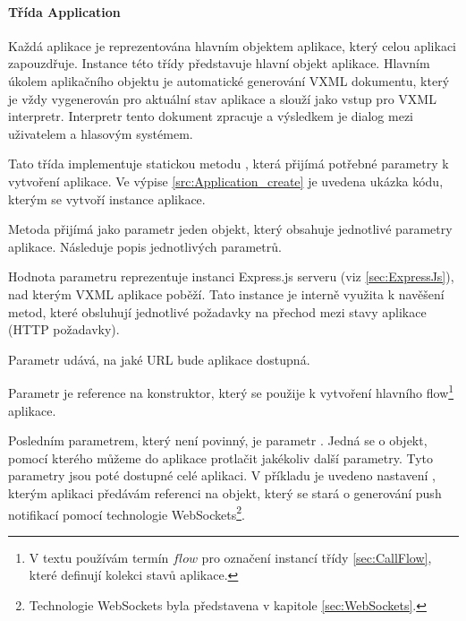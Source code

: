 \documentclass[ing,male,java,dept460]{diploma}						%
\begin{document}


\paragraph{Třída Application}
\label{sec:Application}
Každá aplikace je reprezentována hlavním objektem aplikace, který celou aplikaci zapouzdřuje. Instance této třídy představuje hlavní objekt aplikace. Hlavním úkolem aplikačního objektu je automatické generování VXML dokumentu, který je vždy vygenerován pro aktuální stav aplikace a slouží jako vstup pro VXML interpretr. Interpretr tento dokument zpracuje a výsledkem je dialog mezi uživatelem a hlasovým systémem.

Tato třída implementuje statickou metodu , která přijímá potřebné parametry k vytvoření aplikace. Ve výpise \ref{src:Application_create} je uvedena ukázka kódu, kterým se vytvoří instance aplikace.



Metoda  přijímá jako parametr jeden objekt, který obsahuje jednotlivé parametry aplikace. Následuje popis jednotlivých parametrů.

Hodnota parametru  reprezentuje instanci Express.js serveru (viz \ref{sec:ExpressJs}), nad kterým VXML aplikace poběží. Tato instance je interně využita k navěšení metod, které obsluhují jednotlivé požadavky na přechod mezi stavy aplikace (HTTP požadavky).

Parametr  udává, na jaké URL bude aplikace dostupná.

Parametr  je reference na konstruktor, který se použije k vytvoření hlavního flow\footnote{V textu používám termín $flow$ pro označení instancí třídy \ref{sec:CallFlow}, které definují kolekci stavů aplikace.} aplikace.

Posledním parametrem, který není povinný, je parametr . Jedná se o objekt, pomocí kterého můžeme do aplikace protlačit jakékoliv další parametry. Tyto parametry jsou poté dostupné celé aplikaci. V příkladu je uvedeno nastavení , kterým aplikaci předávám referenci na objekt, který se stará o generování push notifikací pomocí technologie WebSockets\footnote{Technologie WebSockets byla představena v kapitole \ref{sec:WebSockets}.}.
\end{document}

